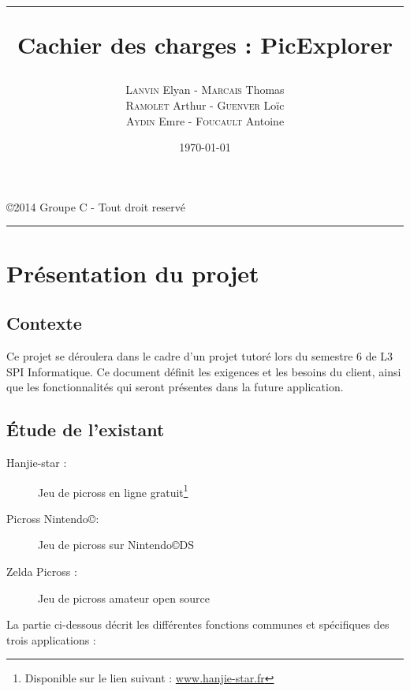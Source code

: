 \documentclass[a4paper, 12pt, twoside]{article}
\title{\hrule \vspace{1cm} Cachier des charges : PicExplorer}
\author{\textsc{Lanvin} Elyan - \textsc{Marcais} Thomas\\ \textsc{Ramolet} Arthur - \textsc{Guenver} Loïc\\ \textsc{Aydin} Emre - \textsc{Foucault} Antoine}
\date{\today}
\begin{document}
\pagestyle{fancy}
\lhead{}
\chead{}
\rhead{\leftmark}
\cfoot{}

\clearpage\thispagestyle{empty}

\maketitle
\begin{center}
 \copyright 2014 Groupe C - Tout droit reservé\\
\end{center}
\vspace{1cm}
\hrule

\newpage

\renewcommand{\contentsname}{Sommaire}
\tableofcontents
\newpage

\section{Présentation du projet}

\subsection{Contexte}

Ce projet se déroulera dans le cadre d'un projet tutoré lors du semestre 6 de L3 SPI Informatique. Ce document définit les exigences et les besoins du client, ainsi que les fonctionnalités qui seront présentes dans la future application.

\subsection{Étude de l'existant}

\begin{description}

  \item[Hanjie-star :] Jeu de picross en ligne gratuit\footnote{Disponible sur le lien suivant : \url{www.hanjie-star.fr}}
  \item[Picross Nintendo\copyright :]  Jeu de picross sur Nintendo\copyright \space DS
  \item[Zelda Picross :] Jeu de picross amateur open source

\end{description}

La partie ci-dessous décrit les différentes fonctions communes et spécifiques des trois applications : \newline
\end{document}
